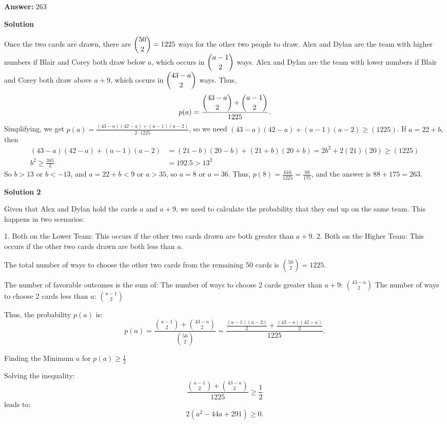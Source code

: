 \begin{enumerate}
 
 \textbf{Answer: }263



\textbf{Solution}

Once the two cards are drawn, there are $\dbinom{50}{2} = 1225$ ways for the other two people to draw. Alex and Dylan are the team with higher numbers if Blair and Corey both draw below $a$, which occurs in $\dbinom{a-1}{2}$ ways. Alex and Dylan are the team with lower numbers if Blair and Corey both draw above $a+9$, which occurs in $\dbinom{43-a}{2}$ ways. Thus, 
 \[p(a)=\frac{\dbinom{43-a}{2}+\dbinom{a-1}{2}}{1225}.\] Simplifying, we get $p(a)=\frac{(43-a)(42-a)+(a-1)(a-2)}{2\cdot1225}$, so we need $(43-a)(42-a)+(a-1)(a-2)\ge (1225)$. If $a=22+b$, then 
 \begin{align*}(43-a)(42-a)+(a-1)(a-2)&=(21-b)(20-b)+(21+b)(20+b)=2b^2+2(21)(20)\ge (1225) \\ b^2\ge \frac{385}{2} &= 192.5 >13^2 \end{align*}
 So $b> 13$ or $b< -13$, and $a=22+b<9$ or $a>35$, so $a=8$ or $a=36$. Thus, $p(8) = \frac{616}{1225} = \frac{88}{175}$, and the answer is $88+175 = \boxed{263}$.

 



\textbf{Solution 2}

Given that Alex and Dylan hold the cards $a$ and $a+9$, we need to calculate the probability that they end up on the same team. This happens in two scenarios:

 1. Both on the Lower Team: This occurs if the other two cards drawn are both greater than $a+9$.  2. Both on the Higher Team: This occurs if the other two cards drawn are both less than $a$.

 The total number of ways to choose the other two cards from the remaining 50 cards is $\binom{50}{2} = 1225$.

 The number of favorable outcomes is the sum of:  The number of ways to choose 2 cards greater than $a+9$: $\binom{43-a}{2}$  The number of ways to choose 2 cards less than $a$: $\binom{a-1}{2}$ 

 Thus, the probability $p(a)$ is:
 \[p(a) = \frac{\binom{a-1}{2} + \binom{43-a}{2}}{\binom{50}{2}} = \frac{\frac{(a-1)(a-2)}{2} + \frac{(43-a)(42-a)}{2}}{1225}.\]

 Finding the Minimum $a$ for $p(a) \geq \frac{1}{2}$

 Solving the inequality:
 \[\frac{\binom{a-1}{2} + \binom{43-a}{2}}{1225} \geq \frac{1}{2}\]leads to:
 \[2(a^2 - 44a + 291) \geq 0.\]


\end{enumerate}
